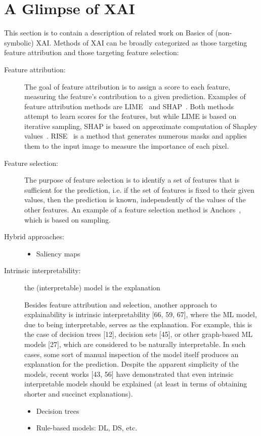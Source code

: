 \section{A  Glimpse of XAI} \label{sec:glimpsexai}

This section is to contain a description of related work on 
Basics of (non-symbolic) XAI.
%
Methods of XAI can be broadly categorized as those targeting feature
attribution and those targeting feature selection:

\begin{description} 
\item[Feature attribution:] %
%
The goal of feature attribution is to assign a score to each feature, 
measuring the feature's contribution to a given prediction. 
Examples of feature attribution methods are
LIME~\cite{guestrin-kdd16} and SHAP~\cite{lundberg-nips17}. 
Both methods attempt to learn scores for the features, 
but while LIME is based on iterative sampling, SHAP is based on
approximate computation of Shapley values~\cite{shapley53}. 
%
RISE~\cite{Petsiuk-corr18} is a method that generates numerous masks 
and applies them to the input image to measure the importance of each pixel.

\item[Feature selection:]
The purpose of feature selection is to identify a set of features
that is sufficient for the prediction, i.e. if the set of features is fixed to their
given values, then the prediction is known, independently of the values of the
other features. An example of a feature selection method is Anchors~\cite{guestrin-aaai18},
which is based on sampling.

\item[Hybrid approaches:]
\begin{itemize}
\item Saliency maps~\cite{muller-ieee-proc21}
\end{itemize}

\item[Intrinsic interpretability:] the (interpretable) model is the explanation 

Besides feature attribution and selection, another approach to explainability is intrinsic interpretability [66, 59, 67], where the ML model, due to being
interpretable, serves as the explanation. For example, this is the case of decision trees [12], decision sets [45], or other graph-based ML models [27], which
are considered to be naturally interpretable. In such cases, some sort of manual inspection of the model itself produces an explanation for the prediction.
Despite the apparent simplicity of the models, recent works [43, 56] have
demonstrated that even intrinsic interpretable models should be explained
(at least in terms of obtaining shorter and succinct explanations).

\begin{itemize}
\item Decision trees
\item Rule-based models: DL, DS, etc.
\end{itemize}

\end{description}